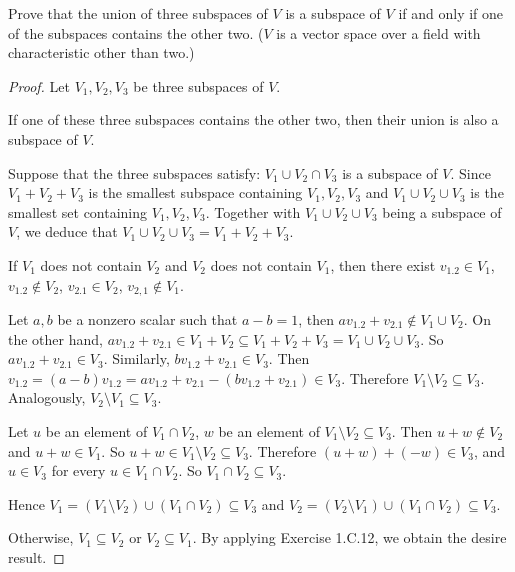 \begin{exercise}
    Prove that the union of three subspaces of $V$ is a subspace of $V$ if and only if one of the subspaces contains the other two. ($V$ is a vector space over a field with characteristic other than two.)
\end{exercise}

\begin{proof}
    Let $V_{1}, V_{2}, V_{3}$ be three subspaces of $V$.

    If one of these three subspaces contains the other two, then their union is also a subspace of $V$.

    Suppose that the three subspaces satisfy: $V_{1}\cup V_{2}\cap V_{3}$ is a subspace of $V$. Since $V_{1} + V_{2} + V_{3}$ is the smallest subspace containing $V_{1}, V_{2}, V_{3}$ and $V_{1}\cup V_{2}\cup V_{3}$ is the smallest set containing $V_{1}, V_{2}, V_{3}$. Together with $V_{1}\cup V_{2}\cup V_{3}$ being a subspace of $V$, we deduce that $V_{1}\cup V_{2}\cup V_{3} = V_{1} + V_{2} + V_{3}$.

    If $V_{1}$ does not contain $V_{2}$ and $V_{2}$ does not contain $V_{1}$, then there exist $v_{1.2}\in V_{1}$, $v_{1.2}\notin V_{2}$, $v_{2.1}\in V_{2}$, $v_{2,1}\notin V_{1}$.

    Let $a, b$ be a nonzero scalar such that $a - b = 1$, then $av_{1.2} + v_{2.1}\notin V_{1}\cup V_{2}$. On the other hand, $av_{1.2} + v_{2.1}\in V_{1} + V_{2}\subseteq V_{1} + V_{2} + V_{3} = V_{1}\cup V_{2}\cup V_{3}$. So $av_{1.2} + v_{2.1}\in V_{3}$. Similarly, $bv_{1.2} + v_{2.1}\in V_{3}$. Then $v_{1.2} = (a - b)v_{1.2} = av_{1.2} + v_{2.1} - (bv_{1.2} + v_{2.1})\in V_{3}$. Therefore $V_{1}\setminus V_{2}\subseteq V_{3}$. Analogously, $V_{2}\setminus V_{1}\subseteq V_{3}$.

    Let $u$ be an element of $V_{1}\cap V_{2}$, $w$ be an element of $V_{1}\setminus V_{2}\subseteq V_{3}$. Then $u + w\notin V_{2}$ and $u + w\in V_{1}$. So $u + w\in V_{1}\setminus V_{2}\subseteq V_{3}$. Therefore $(u + w) + (-w)\in V_{3}$, and $u\in V_{3}$ for every $u\in V_{1}\cap V_{2}$. So $V_{1}\cap V_{2}\subseteq V_{3}$.

    Hence $V_{1} = (V_{1}\setminus V_{2})\cup (V_{1}\cap V_{2})\subseteq V_{3}$ and $V_{2} = (V_{2}\setminus V_{1})\cup (V_{1}\cap V_{2})\subseteq V_{3}$.

    Otherwise, $V_{1}\subseteq V_{2}$ or $V_{2}\subseteq V_{1}$. By applying Exercise 1.C.12, we obtain the desire result.
\end{proof}

